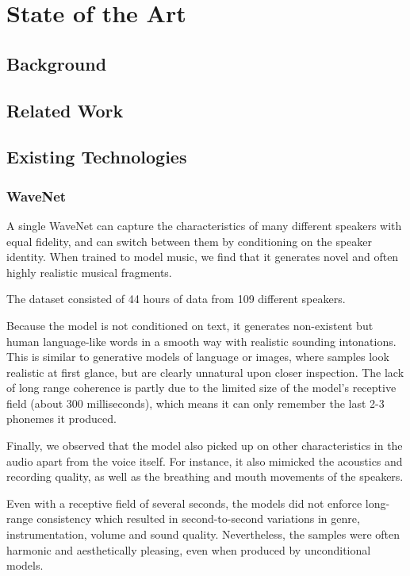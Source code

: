 \chapter{State of the Art} \label{chap:sota}

\section{Background} \label{sec:background}

\section{Related Work} \label{sec:related}

\section{Existing Technologies} \label{sec:existing}

\subsection{WaveNet} \label{subsec:tech-wavenet}
\cite{oord_wavenet_2016}

A single WaveNet can capture the characteristics of many different speakers with equal fidelity, and can switch between them by conditioning on the speaker identity. When trained to model music, we find that it generates novel and often highly realistic musical fragments.

The dataset consisted of 44 hours of data from 109 different speakers.

Because the model is not conditioned on text, it generates non-existent but human language-like words in a smooth way with realistic sounding intonations. This is similar to generative models of language or images, where samples look realistic at first glance, but are clearly unnatural upon closer inspection. The lack of long range coherence is partly due to the limited size of the model's receptive field (about 300 milliseconds), which means it can only remember the last 2-3 phonemes it produced.

Finally, we observed that the model also picked up on other characteristics in the audio apart from the voice itself. For instance, it also mimicked the acoustics and recording quality, as well as the breathing and mouth movements of the speakers.

Even with a receptive field of several seconds, the models did not enforce long-range consistency which resulted in second-to-second variations in genre, instrumentation, volume and sound quality. Nevertheless, the samples were often harmonic and aesthetically pleasing, even when produced by unconditional models.

